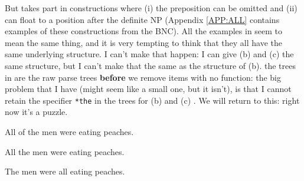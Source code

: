 \documentclass[11pt,a4paper]{article}
\begin{document}
\begin{figure}[ht]
\begin{minipage}[t]{0.45\linewidth}
{{   }
}
\end{minipage}
\hspace*{\fill}
\caption{}\label{FIG:SOME/ALL}
\end{figure}

But  takes part in constructions where (i) the preposition
 can be omitted and (ii)  can float to a position after
the definite NP (Appendix \ref{APP:ALL} contains examples of these
constructions from the BNC). All the examples in  seem to mean the same
thing, and it is very tempting to think that they all have the same
underlying structure. I can't make that happen: I can give
(b) and (c) the same structure, but I can't make
that the same as the structure of (b). the trees in
 are the raw parse trees \textbf{before} we remove items
with no function: the big problem that I have (might seem like a small
one, but it isn't), is that I cannot retain the specifier
\texttt{*the} in the trees for (b) and (c) . We will return to
this: right now it's a puzzle.

\begin{examples}
\item \label{ALL}
\begin{examples}
\item
All of the men were eating peaches.
\item
All the men were eating peaches.
\item
The men were all eating peaches.
\end{examples}
\end{examples}
\end{document}
